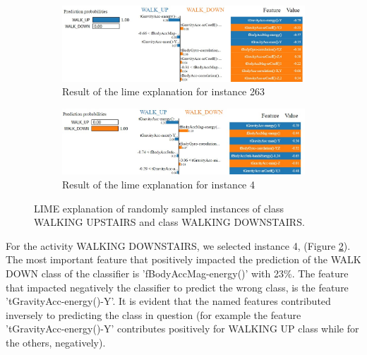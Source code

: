 \documentclass[10pt, a4paper, twocolumn]{article}
\begin{document}
\begin{figure}
    \centering

    \begin{subfigure}{0.95\columnwidth}
    \includegraphics[width=\columnwidth]{immagini Lia/lime.jpg}
    \caption{Result of the lime explanation for instance 263}
    \label{fig:lime}
    \end{subfigure}
    
    \begin{subfigure}{0.95\columnwidth}

    \includegraphics[width=\columnwidth]{immagini Lia/lime 2.jpg}
    \caption{Result of the lime explanation for instance 4}
    \label{fig:lime2}
    \end{subfigure}
    
    \caption{LIME explanation of randomly sampled instances of class WALKING UPSTAIRS and class WALKING DOWNSTAIRS.}
    \label{fig:limee}
\end{figure}


For the activity WALKING DOWNSTAIRS, we selected instance 4, (Figure \ref{fig:lime2}). The most important feature that positively impacted the prediction of the WALK DOWN class of the classifier is 'fBodyAccMag-energy()' with 23\%. The feature that impacted negatively the classifier to predict the wrong class, is the feature 'tGravityAcc-energy()-Y'. It is evident that the named features contributed inversely to predicting the class in question (for example the feature 'tGravityAcc-energy()-Y' contributes positively for WALKING UP class while for the others, negatively).
\end{document}
